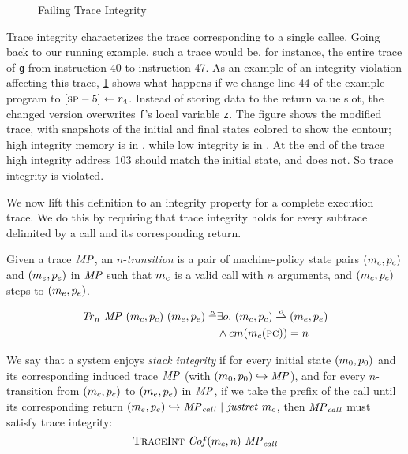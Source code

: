 \documentclass[acmsmall,review,anonymous]{acmart}\settopmatter{printfolios=true,printccs=false,printacmref=false}
\begin{document}
{\begin{figure}
  \integrityexample
  \caption{Failing Trace Integrity}
  \label{fig:intex}
\end{figure}

Trace integrity characterizes the trace corresponding to a single
callee.
Going back to our running example, such a trace would be, for
instance, the entire trace of {\tt g} from instruction 40 to
instruction 47.
As an example of an integrity violation affecting this trace, \cref{fig:intex} shows what happens
if we change line 44 of the example program to $[\textsc{sp} - 5] \leftarrow r_4$.
Instead of storing data to the return value slot,
the changed version overwrites {\tt f}'s local variable {\tt z}.
The figure shows the modified trace, with snapshots of the initial
and final states colored to show the contour; high
integrity memory is in \high, while low integrity is in \low.
At the end of the trace high integrity address 103 should match the initial
state, and does not. So trace integrity is violated.

We now lift this definition to an integrity property for a complete
execution trace. We do this by requiring that trace integrity holds
for every subtrace delimited by a call and its corresponding return.

 Given a trace \(\mathit{MP}\), %
an \(n\)-{\em transition} is a pair of
machine-policy state pairs \((m_c,p_c)\) and
\((m_e,p_e)\) in \(\mathit{MP}\) such that
\(m_c\) is a valid call with \(n\) arguments, and
\((m_c,p_c)\) steps to \((m_e,p_e)\).


  \[\begin{split}
    \mathit{Tr}_n ~ \mathit{MP} ~ (m_c,p_c) ~ (m_e,p_e)
    \triangleq & \exists o.
    ~ (m_c,p_c) \overset{o}{\rightharpoonup} (m_e,p_e) \\
    & \land cm(m_c(\textsc{pc})) = n
  \end{split}\]


We say that a system enjoys {\em stack integrity} if for every initial
state $(m_0,p_0)$ and its corresponding induced trace $\mathit{MP}$ (with
$(m_0,p_0) \hookrightarrow \mathit{MP}$), and for every
$n$-transition from $(m_c,p_c)$ to
$(m_e,p_e)$ in $\mathit{MP}$, if we take the prefix of the
call until its corresponding return $(m_e,p_e)
\hookrightarrow \mathit{MP}_{\mathit{call}} ~ | ~ \mathit{justret}\ m_c$, then $\mathit{MP}_{\mathit{call}}$ must
satisfy trace integrity:
\[\text{\sc TraceInt} ~ \mathit{Cof}(m_c,n) ~ \mathit{MP}_{\mathit{call}}\]

}
\end{document}
